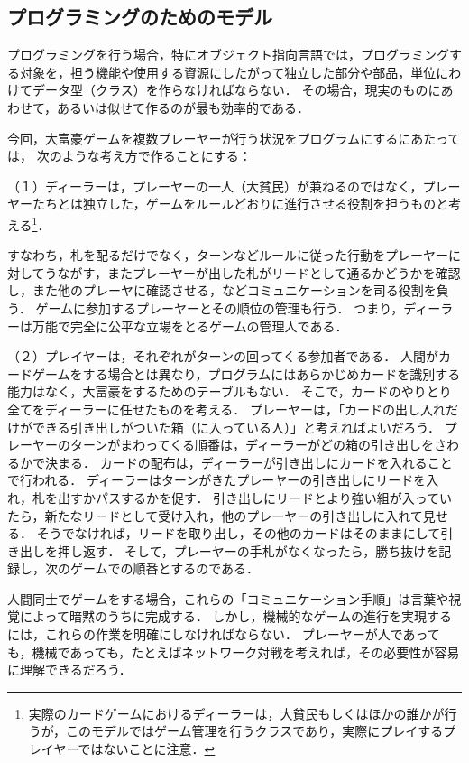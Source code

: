 \subsection{プログラミングのためのモデル}
プログラミングを行う場合，特にオブジェクト指向言語では，プログラミングする対象を，担う機能や使用する資源にしたがって独立した部分や部品，単位にわけてデータ型（クラス）を作らなければならない．
その場合，現実のものにあわせて，あるいは似せて作るのが最も効率的である．

今回，大富豪ゲームを複数プレーヤーが行う状況をプログラムにするにあたっては，
次のような考え方で作ることにする：

（１）ディーラーは，プレーヤーの一人（大貧民）が兼ねるのではなく，プレーヤーたちとは独立した，ゲームをルールどおりに進行させる役割を担うものと考える\footnote{実際のカードゲームにおけるディーラーは，大貧民もしくはほかの誰かが行うが，このモデルではゲーム管理を行うクラスであり，実際にプレイするプレイヤーではないことに注意．}．

すなわち，札を配るだけでなく，ターンなどルールに従った行動をプレーヤーに対してうながす，またプレーヤーが出した札がリードとして通るかどうかを確認し，また他のプレーヤに確認させる，などコミュニケーションを司る役割を負う．
ゲームに参加するプレーヤーとその順位の管理も行う．
つまり，ディーラーは万能で完全に公平な立場をとるゲームの管理人である．

（２）プレイヤーは，それぞれがターンの回ってくる参加者である．
人間がカードゲームをする場合とは異なり，プログラムにはあらかじめカードを識別する能力はなく，大富豪をするためのテーブルもない．
そこで，カードのやりとり全てをディーラーに任せたものを考える．
プレーヤーは，「カードの出し入れだけができる引き出しがついた箱（に入っている人）」と考えればよいだろう．
プレーヤーのターンがまわってくる順番は，ディーラーがどの箱の引き出しをさわるかで決まる．
カードの配布は，ディーラーが引き出しにカードを入れることで行われる．
ディーラーはターンがきたプレーヤーの引き出しにリードを入れ，札を出すかパスするかを促す．
引き出しにリードとより強い組が入っていたら，新たなリードとして受け入れ，他のプレーヤーの引き出しに入れて見せる．
そうでなければ，リードを取り出し，その他のカードはそのままにして引き出しを押し返す．
そして，プレーヤーの手札がなくなったら，勝ち抜けを記録し，次のゲームでの順番とするのである．

人間同士でゲームをする場合，これらの「コミュニケーション手順」は言葉や視覚によって暗黙のうちに完成する．
しかし，機械的なゲームの進行を実現するには，これらの作業を明確にしなければならない．
プレーヤーが人であっても，機械であっても，たとえばネットワーク対戦を考えれば，その必要性が容易に理解できるだろう．


